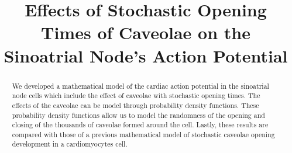 \documentclass{bmcart}%
\begin{document}
\begin{frontmatter}

\begin{fmbox}


\title{Effects of Stochastic Opening Times of Caveolae on the Sinoatrial Node's Action Potential}


\author[
   addressref={aff1},
   corref={aff1},
   noteref={n1},
   email={rich1638@pacificu.edu}
]{ }


\address[id=aff1]{                           %
  , 			  %
  ,                     			  
  ,                        %
}


\begin{artnotes}
\end{artnotes}
\end{fmbox}%


\begin{abstractbox}

\begin{abstract}
    
We developed a mathematical model of the cardiac action potential in the sinoatrial node cells which include the effect of caveolae with stochastic opening times. The effects of the caveolae can be model through probability density functions. These probability density functions allow us to model the randomness of the opening and closing of the thousands of caveolae formed around the cell. Lastly, these results are compared with those of a previous mathematical model of stochastic caveolae opening development in a cardiomyocytes cell.

 \end{abstract}


\begin{keyword}
\end{keyword}

\end{abstractbox}

\end{frontmatter}
\end{document}
